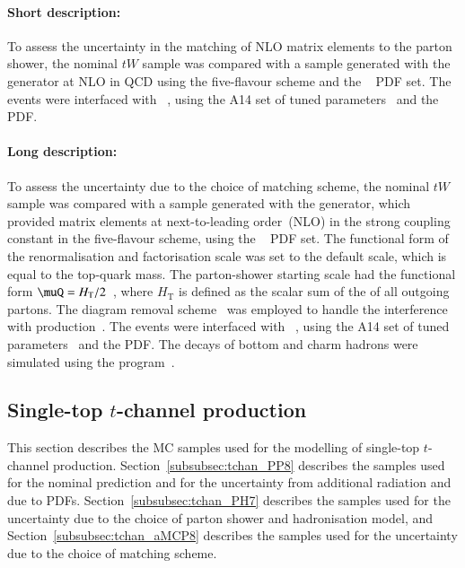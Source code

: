 \paragraph{Short description:}

To assess the uncertainty in the matching of NLO matrix elements to the
parton shower, the nominal $tW$ sample was compared with a sample generated
with the \MGNLO[2.6.2] generator at NLO in QCD using the five-flavour
scheme and the \NNPDF[2.3nlo]~\cite{Ball:2014uwa} PDF set. The events were
interfaced with \PYTHIA[8.230]~\cite{Sjostrand:2014zea}, using the A14
set of tuned parameters~\cite{ATL-PHYS-PUB-2014-021} and the \NNPDF[2.3lo]
PDF.

\paragraph{Long description:}

To assess the uncertainty due to the choice of matching scheme, the nominal $tW$ sample was compared with a sample generated
with the \MGNLO[2.6.2] generator, which provided matrix elements at next-to-leading order~(NLO) in the strong coupling constant \alphas
in the five-flavour scheme, using the \NNPDF[2.3nlo]~\cite{Ball:2014uwa} PDF set.
The functional form of the renormalisation and factorisation scale was set to the default scale, which is equal to the top-quark mass.
The parton-shower starting scale had the functional form $\muQ = H_{\mathrm T}/2$~\cite{ATL-PHYS-PUB-2017-007}, 
where $H_{\mathrm T}$ is defined as the scalar sum of the \pT of all outgoing partons.
The diagram removal scheme~\cite{Frixione:2008yi} was employed to handle the interference with \ttbar production~\cite{ATL-PHYS-PUB-2016-020}.
The events were interfaced with \PYTHIA[8.230]~\cite{Sjostrand:2014zea}, using the A14 set of tuned parameters~\cite{ATL-PHYS-PUB-2014-021} 
and the \NNPDF[2.3lo] PDF.
The decays of bottom and charm hadrons were simulated using the \EVTGEN[1.6.0] program~\cite{Lange:2001uf}.



\subsection{Single-top \texorpdfstring{$t$}{t}-channel production}
\label{subsec:tchan}

This section describes the MC samples used for the modelling of single-top $t$-channel production.
Section~\ref{subsubsec:tchan_PP8} describes the \POWPY[8] samples used for the nominal prediction
and for the uncertainty from additional radiation and due to PDFs.
Section~\ref{subsubsec:tchan_PH7} describes the \POWHER[7] samples used for the uncertainty due to the choice of parton shower and hadronisation model,
and Section~\ref{subsubsec:tchan_aMCP8} describes the \MGNLOPY[8] samples used for the uncertainty due to the choice of matching scheme.

